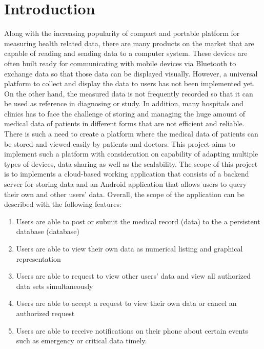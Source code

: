 \section{Introduction}
Along with the increasing popularity of compact and portable platform for measuring health related data, there are many
products on the market that are capable of reading and sending data to a computer system. These devices are often built
ready for communicating with mobile devices via Bluetooth to exchange data so that those data can be displayed visually.
However, a universal platform to collect and display the data to users has not been implemented yet. On the other hand,
the measured data is not frequently recorded so that it can be used as reference in diagnosing or study. In addition,
many hospitals and clinics has to face the challenge of storing and managing the huge amount of medical data of patients
in different forms that are not efficient and reliable. There is such a need to create a platform where the medical data
of patients can be stored and viewed easily by patients and doctors. This project aims to implement such a platform with
consideration on capability of adapting multiple types of devices, data sharing as well as the scalability.  The scope
of this project is to implements a cloud-based working application that consists of a backend server for storing data
and an Android application that allows users to query their own and other users' data. Overall, the scope of the
application can be described with the following features:
\begin{enumerate}
    \item Users are able to post or submit the medical record (data) to the a persistent database (database)
    \item Users are able to view their own data as numerical listing and graphical representation
    \item Users are able to request to view other users' data and view all authorized data sets simultaneously
    \item Users are able to accept a request to view their own data or cancel an authorized request
    \item Users are able to receive notifications on their phone about certain events such as emergency or critical
        data timely.
\end{enumerate}

